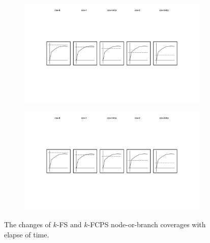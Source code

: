 \begin{figure}
\begin{subfigure}{0.19\textwidth}
  \end{subfigure}
  \begin{subfigure}{0.19\textwidth}
    \centering
    \includegraphics[width=\textwidth]{img/cov-2}
  \end{subfigure}
  \begin{subfigure}{0.19\textwidth}
    \centering
    \includegraphics[width=\textwidth]{img/cov-2-fcp}
  \end{subfigure}
  \caption{
    The changes of $k$-FS and $k$-FCPS node-or-branch coverages with elapse of
    time.
  }
  \label{fig:cov-time}
\end{figure}


